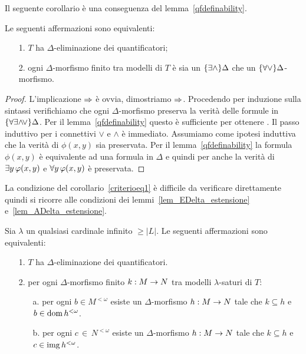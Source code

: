 Il seguente corollario \`e una conseguenza del lemma~\ref{qfdefinability}.

\begin{corollary}\label{criterioeq1}
Le seguenti affermazioni sono equivalenti:
\begin{itemize}
\item[1.] $T$ ha $\Delta$-eliminazione dei quantificatori;
\item[2.] ogni $\Delta$-morfismo finito tra modelli di $T$ \`e sia un $\{\exists\wedge\}\Delta$ che un  $\{\forall\vee\}\Delta$-morfismo.
\end{itemize}
\end{corollary}
\begin{proof}
L'implicazione $\Rightarrow$ \`e ovvia, dimostriamo $\Rightarrow$. Procedendo per induzione sulla sintassi verifichiamo che ogni $\Delta$-morfismo preserva la verit\`a delle formule in $\{\forall\exists\mathord\wedge\!\mathord\vee\}\Delta$. Per il lemma~\ref{qfdefinability} questo \`e sufficiente per ottenere . Il passo induttivo per i connettivi $\vee$ e $\wedge$ \`e immediato.  Assumiamo come ipotesi induttiva che la verit\`a di $\phi(x,y)$ sia preservata.  Per il  lemma~\ref{qfdefinability} la formula $\phi(x,y)$ \`e equivalente ad una formula in $\Delta$ e quindi per  anche la verit\`a di $\exists y\, \varphi (x,y)$ e $\forall y \,\varphi (x,y)$ \`e preservata.
\end{proof}

La condizione  del corollario~\ref{criterioeq1} \`e difficile da verificare direttamente quindi si ricorre alle condizioni  dei lemmi~\ref{lem_EDelta_estensione} e~\ref{lem_ADelta_estensione}.

\begin{corollary}\label{criterioeq2}
Sia $\lambda$ un qualsiasi cardinale infinito $\ge|L|$. Le seguenti affermazioni sono equivalenti:
\begin{itemize}
\item[1.] $T$ ha $\Delta$-eliminazione dei quantificatori.
\item[2.] per ogni $\Delta$-morfismo finito $k:M\rightarrow N$ tra modelli $\lambda$-saturi di $T$:
\begin{itemize}                                                                                               \item[a.] per ogni $b\in M^{<\omega}$ esiste un $\Delta$-morfismo $h:M\rightarrow N$ tale che $k\subseteq h$ e $b\in\mathop{\rm dom} h^{<\omega}$.                                                                                            \item[b.]per ogni $c\,\in\,N^{<\omega}$ esiste un $\Delta$-morfismo $h:M\rightarrow N$ tale che $k\subseteq h$ e $c\in\mathop{\rm img} h^{<\omega}$.\QED                                                                                          \end{itemize}
\end{itemize}
\end{corollary}


